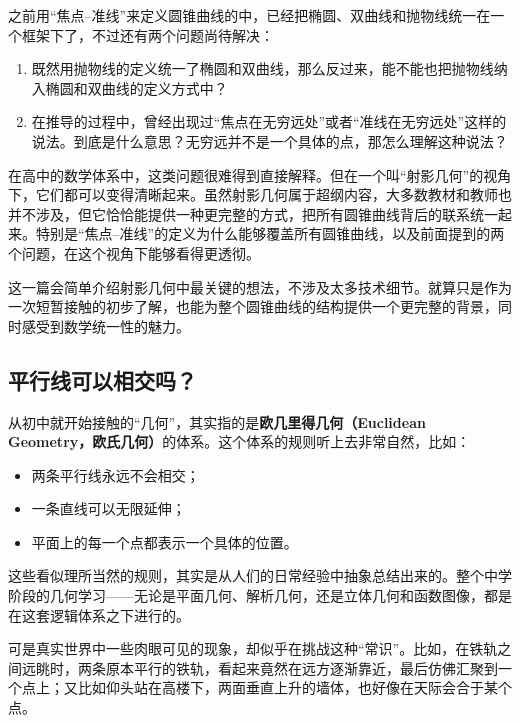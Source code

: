 
\begin{issues}
\issueDraft
\end{issues}


之前用“焦点–准线”来定义圆锥曲线的中，已经把椭圆、双曲线和抛物线统一在一个框架下了，不过还有两个问题尚待解决：
\begin{enumerate}
\item 既然用抛物线的定义统一了椭圆和双曲线，那么反过来，能不能也把抛物线纳入椭圆和双曲线的定义方式中？
\item 在推导的过程中，曾经出现过“焦点在无穷远处”或者“准线在无穷远处”这样的说法。到底是什么意思？无穷远并不是一个具体的点，那怎么理解这种说法？
\end{enumerate}

在高中的数学体系中，这类问题很难得到直接解释。但在一个叫“射影几何”的视角下，它们都可以变得清晰起来。虽然射影几何属于超纲内容，大多数教材和教师也并不涉及，但它恰恰能提供一种更完整的方式，把所有圆锥曲线背后的联系统一起来。特别是“焦点–准线”的定义为什么能够覆盖所有圆锥曲线，以及前面提到的两个问题，在这个视角下能够看得更透彻。

这一篇会简单介绍射影几何中最关键的想法，不涉及太多技术细节。就算只是作为一次短暂接触的初步了解，也能为整个圆锥曲线的结构提供一个更完整的背景，同时感受到数学统一性的魅力。

\subsection{平行线可以相交吗？}

从初中就开始接触的“几何”，其实指的是\textbf{欧几里得几何（Euclidean Geometry，欧氏几何）}的体系。这个体系的规则听上去非常自然，比如：
\begin{itemize}
\item 两条平行线永远不会相交；
\item 一条直线可以无限延伸；
\item 平面上的每一个点都表示一个具体的位置。
\end{itemize}
这些看似理所当然的规则，其实是从人们的日常经验中抽象总结出来的。整个中学阶段的几何学习——无论是平面几何、解析几何，还是立体几何和函数图像，都是在这套逻辑体系之下进行的。

可是真实世界中一些肉眼可见的现象，却似乎在挑战这种“常识”。比如，在铁轨之间远眺时，两条原本平行的铁轨，看起来竟然在远方逐渐靠近，最后仿佛汇聚到一个点上；又比如仰头站在高楼下，两面垂直上升的墙体，也好像在天际会合于某个点。

